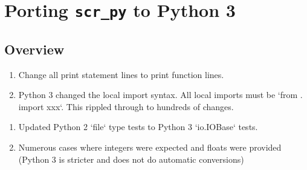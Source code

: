 \chapter{Porting \texttt{scr\_py} to Python 3}
\label{chap:Portingscr_pytoPython3}

\section{Overview}
\label{sec:Portingscr_pytoPython3}

\begin{enumerate}
\item Change all print statement lines to print function lines.

\item Python 3 changed the local import syntax. All local imports must be `from . import xxx`. This rippled through to hundreds of changes.



\end{enumerate}


\begin{enumerate}



\item Updated Python 2 `file` type tests to Python 3 `io.IOBase` tests.

\item Numerous cases where integers were expected and floats were provided (Python 3 is stricter and does not do automatic conversions)

\end{enumerate}


